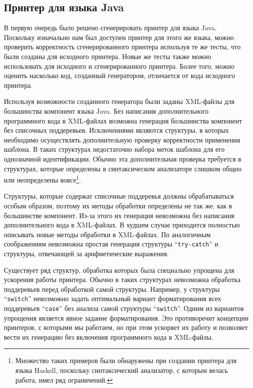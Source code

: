 \documentclass{matmex-diploma}
\begin{document}
\subsection{Принтер для языка Java}
В первую очередь было решено сгенерировать принтер для языка Java. Поскольку изначально нам был доступен принтер для этого же языка, можно проверить корректность сгенерированного принтера используя те же тесты, что были созданы для исходного принтера. Новые же тесты также можно использовать для исходного и сгенерированного принтера. Более того, можно оценить насколько код, созданный генератором, отличается от кода исходного принтера.

Используя возможности созданного генератора были заданы XML-файлы для большинства компонент языка Java. Без написания дополнительного программного кода в XML-файлах возможна генерация большинства компонент без списочных поддеревьев. Исключениями являются структуры, в которых необходимо осуществлять дополнительную проверку корректности применения шаблона. В таких структурах недостаточно набора меток шаблона для его однозначной идентификации. Обычно эта дополнительная проверка требуется в структурах, которые определены в синтаксическом анализаторе слишком общно или неопределены вовсе\footnote{Множество таких примеров были обнаружены при создании принтера для языка Haskell, поскольку синтаксический анализатор, с которым велась работа, имел ряд ограничений.}.

Структуры, которые содержат списочные поддеревья должны обрабатываться особым образом, поэтому их методы обработки определены не так же, как в большинстве компонент. Из-за этого их генерация невозможна без написания дополнительного кода в XML-файлах. В худшем случае приходится полностью описывать новые методы обработки в XML-файлах. По аналогичным соображениям невозможна простая генерация структуры “\lstinline{try-catch}” и структуры, отвечающей за арифметические выражения.

Существует ряд структур, обработка которых была специально упрощена для ускорения работы принтера. Обычно в таких структурах невозможна обработка поддеревьев перед обработкой самой структуры. Например, у структуры “\lstinline{switch}” невозможно задать оптимальный вариант форматирования всех поддеревьев “\lstinline{case}” без анализа самой структуры “\lstinline{switch}”. Одним из вариантов упрощения является явное задание форматирования. Это противоречит концепции принтеров, с которыми мы работаем, но при этом ускоряет их работу \cite{podkopaev:diploma} и позволяет вести их генерацию без включения программного кода в XML-файлы.
\end{document}
